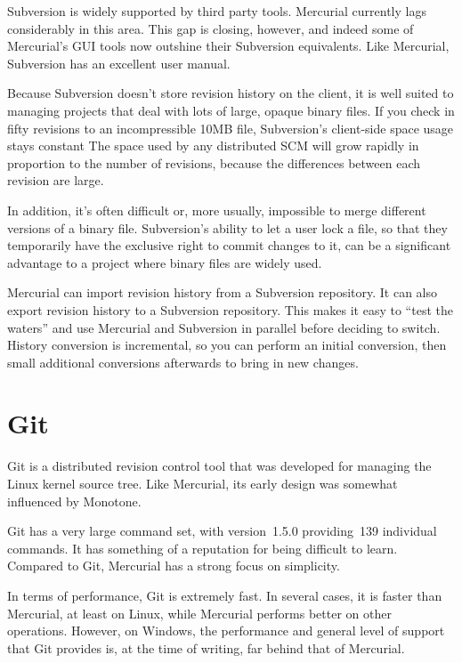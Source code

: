 Subversion is widely supported by third party tools.  Mercurial
currently lags considerably in this area.  This gap is closing,
however, and indeed some of Mercurial's GUI tools now outshine their
Subversion equivalents.  Like Mercurial, Subversion has an excellent
user manual.

Because Subversion doesn't store revision history on the client, it is
well suited to managing projects that deal with lots of large, opaque
binary files.  If you check in fifty revisions to an incompressible
10MB file, Subversion's client-side space usage stays constant The
space used by any distributed SCM will grow rapidly in proportion to
the number of revisions, because the differences between each revision
are large.

In addition, it's often difficult or, more usually, impossible to
merge different versions of a binary file.  Subversion's ability to
let a user lock a file, so that they temporarily have the exclusive
right to commit changes to it, can be a significant advantage to a
project where binary files are widely used.

Mercurial can import revision history from a Subversion repository.
It can also export revision history to a Subversion repository.  This
makes it easy to ``test the waters'' and use Mercurial and Subversion
in parallel before deciding to switch.  History conversion is
incremental, so you can perform an initial conversion, then small
additional conversions afterwards to bring in new changes.


\section{Git}

Git is a distributed revision control tool that was developed for
managing the Linux kernel source tree.  Like Mercurial, its early
design was somewhat influenced by Monotone.

Git has a very large command set, with version~1.5.0 providing~139
individual commands.  It has something of a reputation for being
difficult to learn.  Compared to Git, Mercurial has a strong focus on
simplicity.

In terms of performance, Git is extremely fast.  In several cases, it
is faster than Mercurial, at least on Linux, while Mercurial performs
better on other operations.  However, on Windows, the performance and
general level of support that Git provides is, at the time of writing,
far behind that of Mercurial.

